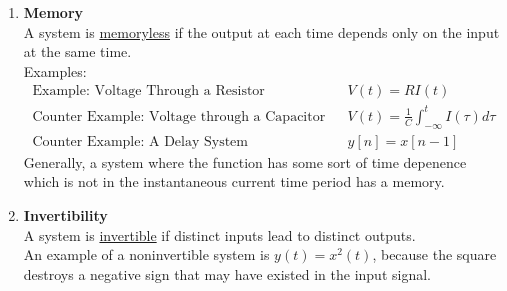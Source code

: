 \documentclass{article}
\begin{document}
\begin{enumerate}
    \item \textbf{Memory}\\
    A system is \underline{memoryless} if the output at each time depends only on the input at the same time.\\
    Examples:
    \begin{align*}
        \textrm{Example: Voltage Through a Resistor} && V(t) = RI(t)\\
        \textrm {Counter Example: Voltage through a Capacitor} && V(t) = \frac{1}{C}\int_{-\infty}^tI(\tau)d\tau \\
        \textrm{Counter Example: A Delay System} && y[n] = x[n-1]
    \end{align*}
    Generally, a system where the function has some sort of time depenence which is not in the instantaneous current time period has a memory.
    
    \item \textbf{Invertibility}\\
    A system is \underline{invertible} if distinct inputs lead to distinct outputs.\\
    An example of a noninvertible system is $y(t) = x^2(t)$, because the square destroys a negative sign that may have existed in the input signal.
    

\end{enumerate}
\end{document}
